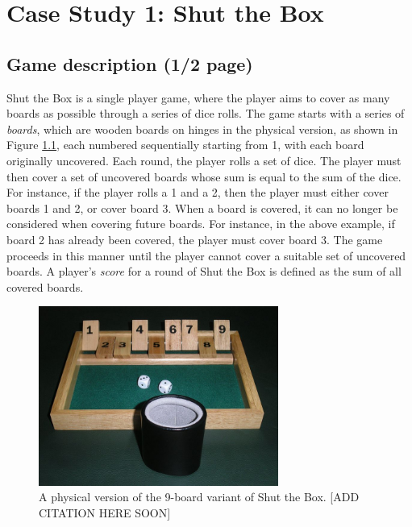 \chapter{Case Study 1: Shut the Box}
\label{cs1}

\section{Game description (1/2 page)}
\label{cs1:stb_description}



Shut the Box is a single player game, where the player aims to cover as many boards as possible through a series of dice rolls. The game starts with a series of \emph{boards}, which are wooden boards on hinges in the physical version, as shown in Figure \ref{cs1:physical_stb}, each numbered sequentially starting from 1, with each board originally uncovered. Each round, the player rolls a set of dice. The player must then cover a set of uncovered boards whose sum is equal to the sum of the dice. For instance, if the player rolls a 1 and a 2, then the player must either cover boards 1 and 2, or cover board 3. When a board is covered, it can no longer be considered when covering future boards. For instance, in the above example, if board 2 has already been covered, the player must cover board 3. The game proceeds in this manner until the player cannot cover a suitable set of uncovered boards. A player's \emph{score} for a round of Shut the Box is defined as the sum of all covered boards.

\begin{figure}[h]
    \centering
    \includegraphics[width=0.7\textwidth]{images/shut_the_box.jpg}
    \caption{A physical version of the 9-board variant of Shut the Box. [ADD CITATION HERE SOON]}
    \label{cs1:physical_stb}
\end{figure}

